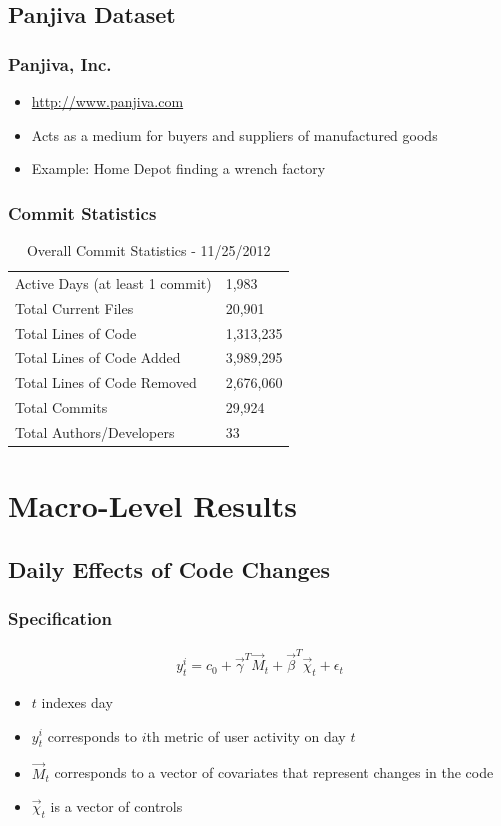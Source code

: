 \documentclass[xcolor=pdftex,dvipsnames,table]{beamer}
\begin{document}
\subsection{Panjiva Dataset}

\frame{\tableofcontents[currentsubsection]}

\frame
{
    \frametitle{Panjiva, Inc.}
    \begin{itemize}
        \item \url{http://www.panjiva.com}
        \item Acts as a medium for buyers and suppliers of manufactured goods
        \item Example: Home Depot finding a wrench factory
    \end{itemize}
}

\frame
{
    \frametitle{Commit Statistics}
    \begin{table}[h!]
    \centering
    \caption{Overall Commit Statistics - 11/25/2012}
    \begin{tabular}{l || l }
    \hline
    Active Days (at least 1 commit) & 1,983 \\
    Total Current Files & 20,901 \\
    Total Lines of Code & 1,313,235 \\
    Total Lines of Code Added & 3,989,295 \\
    Total Lines of Code Removed & 2,676,060 \\
    Total Commits & 29,924 \\
    Total Authors/Developers & 33 \\
    \hline
    \end{tabular}
    \label{table:commit-stats}
    \end{table}
} 

\section{Macro-Level Results}

\subsection{Daily Effects of Code Changes}

\frame{\tableofcontents[currentsubsection]}

\frame
{
    \frametitle{Specification}
    \begin{eqnarray}
    y^i_{t} = c_0 + \vec{\gamma}^T \vec{M}_t + \vec{\beta}^T \vec{\chi}_t + \epsilon_t
    \end{eqnarray}

    \begin{itemize}
        \item $t$ indexes day
        \item $y^i_t$ corresponds to $i$th metric of user activity on day $t$
        \item $\vec{M}_t$ corresponds to a vector of covariates that represent changes in the code
        \item $\vec{\chi}_t$ is a vector of controls
    \end{itemize}
}   
\end{document}
